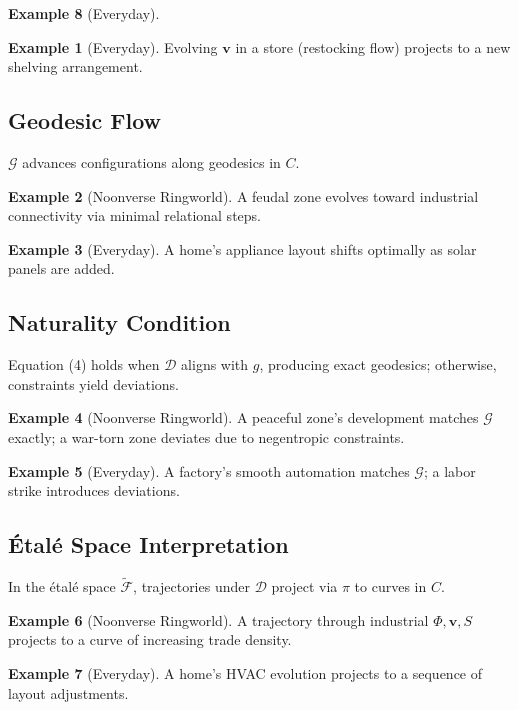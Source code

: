 \documentclass[11pt]{article}
\theoremstyle{plain}
\theoremstyle{definition}
\newtheorem{example}{Example}[section]
\begin{document}
\begin{example}[Everyday]
\begin{example}[Everyday]
Evolving $\mathbf{v}$ in a store (restocking flow) projects to a new shelving arrangement.
\end{example}

\subsection{Geodesic Flow}
$\mathcal{G}$ advances configurations along geodesics in $C$.

\begin{example}[Noonverse Ringworld]
A feudal zone evolves toward industrial connectivity via minimal relational steps.
\end{example}

\begin{example}[Everyday]
A home’s appliance layout shifts optimally as solar panels are added.
\end{example}

\subsection{Naturality Condition}
Equation (4) holds when $\mathcal{D}$ aligns with $g$, producing exact geodesics; otherwise, constraints yield deviations.

\begin{example}[Noonverse Ringworld]
A peaceful zone’s development matches $\mathcal{G}$ exactly; a war-torn zone deviates due to negentropic constraints.
\end{example}

\begin{example}[Everyday]
A factory’s smooth automation matches $\mathcal{G}$; a labor strike introduces deviations.
\end{example}

\subsection{Étalé Space Interpretation}
In the étalé space $\widetilde{\mathscr{F}}$, trajectories under $\mathcal{D}$ project via $\pi$ to curves in $C$.

\begin{example}[Noonverse Ringworld]
A trajectory through industrial $\Phi, \mathbf{v}, S$ projects to a curve of increasing trade density.
\end{example}

\begin{example}[Everyday]
A home’s HVAC evolution projects to a sequence of layout adjustments.
\end{example}


\end{example}
\end{document}
